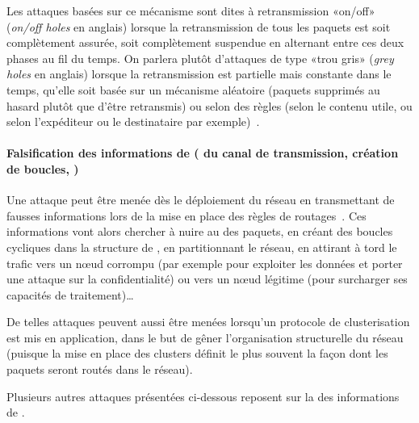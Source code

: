 Les attaques basées sur ce mécanisme sont dites à retransmission «on/off» (\textit{on/off holes} en anglais) lorsque la retransmission de tous les paquets est soit complètement assurée, soit complètement suspendue en alternant entre ces deux phases au fil du temps.
On parlera plutôt d'attaques de type «trou gris» (\textit{grey holes} en anglais) lorsque la retransmission est partielle mais constante dans le temps, qu'elle soit basée sur un mécanisme aléatoire (paquets supprimés au hasard plutôt que d'être retransmis) ou selon des règles (selon le contenu utile, ou selon l'expéditeur ou le destinataire par exemple)~\cite{ZTLMK13}.

        \paragraph{Falsification des informations de  ( du canal de transmission, création de boucles, \etc)}
Une attaque peut être menée dès le déploiement du réseau en transmettant de fausses informations lors de la mise en place des règles de routages~\cite{AD14}.
Ces informations vont alors chercher à nuire au  des paquets, en créant des boucles cycliques dans la structure de , en partitionnant le réseau, en attirant à tord le trafic vers un nœud corrompu (par exemple pour exploiter les données et porter une attaque sur la confidentialité) ou vers un nœud légitime (pour surcharger ses capacités de traitement)\dots

De telles attaques peuvent aussi être menées lorsqu'un protocole de clusterisation est mis en application, dans le but de gêner l'organisation structurelle du réseau (puisque la mise en place des clusters définit le plus souvent la façon dont les paquets seront routés dans le réseau).

Plusieurs autres attaques présentées ci-dessous reposent sur la  des informations de .

